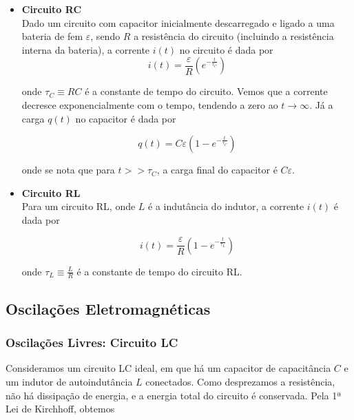 \documentclass[12pt]{article}
\begin{document}
\begin{itemize}
    \item [(a)] \textbf{Circuito RC}\\
        Dado um circuito com capacitor inicialmente descarregado e ligado a uma bateria de fem \(\varepsilon\), sendo \(R\) a resistência do circuito (incluindo a resistência interna da bateria), a corrente \(i(t)\) no circuito é dada por
            \begin{equation}
                \boxed{i(t) = \frac{\varepsilon}{R} \left(e^{-\frac{t}{\tau_C}}\right)}
            \end{equation}

            \noindent onde \(\tau_C \equiv RC\) é a constante de tempo do circuito. Vemos que a corrente decresce exponencialmente com o tempo, tendendo a zero ao \(t \to \infty\). Já a carga \(q(t)\) no capacitor é dada por

            \begin{equation}
                \boxed{q(t) = C\varepsilon \left(1 - e^{-\frac{t}{\tau_C}}\right)}
            \end{equation}

            \noindent onde se nota que para \(t >> \tau_C\), a carga final do capacitor é \(C\varepsilon\).

    \item [(b)] \textbf{Circuito RL}\\
        Para um circuito RL, onde \(L\) é a indutância do indutor, a corrente \(i(t)\) é dada por

        \begin{equation}
            \boxed{i(t) = \frac{\varepsilon}{R} \left(1 - e^{-\frac{t}{\tau_L}}\right)}
        \end{equation}

        \noindent onde \(\displaystyle \tau_L \equiv \frac{L}{R}\) é a constante de tempo do circuito RL.
    \end{itemize}

\subsection{Oscilações Eletromagnéticas}

\subsubsection{Oscilações Livres: Circuito LC}

Consideramos um circuito LC ideal, em que há um capacitor de capacitância \(C\) e um indutor de autoindutância \(L\) conectados. Como desprezamos a resistência, não há dissipação de energia, e a energia total do circuito é conservada. Pela 1ª Lei de Kirchhoff, obtemos
\end{document}
